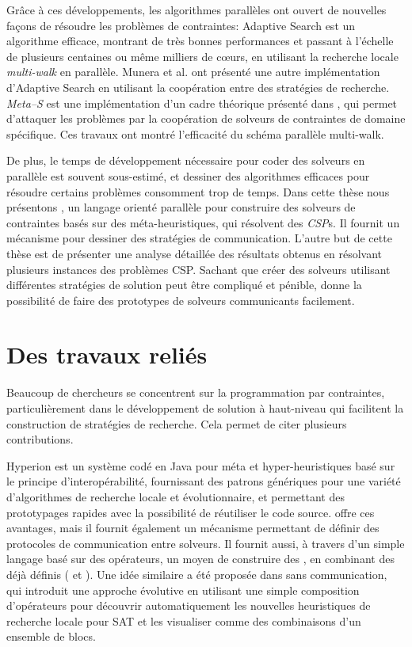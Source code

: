 Gr\^ace \`a ces d\'eveloppements, les algorithmes parall\`eles ont ouvert de nouvelles fa\c{c}ons de r\'esoudre les probl\`emes de contraintes: Adaptive Search \cite{Diaz} est un algorithme efficace, montrant de tr\`es bonnes performances et passant \`a l'\'echelle de plusieurs centaines ou m\^eme milliers de c\oe urs, en utilisant la recherche locale {\it multi-walk} en parall\`ele. Munera et al. \cite{Munera} ont pr\'esent\'e une autre impl\'ementation d'Adaptive Search en utilisant la coop\'eration entre des strat\'egies de recherche. {\it Meta--S} est une impl\'ementation d'un cadre th\'eorique pr\'esent\'e dans \cite{Frank2003}, qui permet d'attaquer les probl\`emes par la coop\'eration de solveurs de contraintes de domaine sp\'ecifique. 
Ces travaux ont montr\'e l'efficacit\'e du sch\'ema parall\`ele multi-walk.  

De plus, le temps de d\'eveloppement n\'ecessaire pour coder des solveurs en parall\`ele est souvent sous-estim\'e, et dessiner des algorithmes efficaces pour r\'esoudre certains probl\`emes consomment trop de temps. Dans cette thèse nous présentons \posl{}, un langage orient\'e parall\`ele pour construire des solveurs de contraintes bas\'es sur des m\'eta-heuristiques, qui r\'esolvent des {\it CSP}s. Il fournit un m\'ecanisme pour dessiner des stratégies de communication. L'autre but de cette thèse est de présenter une analyse d\'etaill\'ee des r\'esultats obtenus en r\'esolvant plusieurs instances des probl\`emes CSP. Sachant que cr\'eer des solveurs utilisant diff\'erentes strat\'egies de solution peut être compliqu\'e et p\'enible, \posl{} donne la possibilit\'e de faire des prototypes de solveurs communicants facilement.  

\section {Des travaux reli\'es}

Beaucoup de chercheurs se concentrent sur la programmation par contraintes, particuli\`erement dans le d\'eveloppement de solution \`a haut-niveau qui facilitent la construction de strat\'egies de recherche. Cela permet de citer plusieurs contributions. 

{\sc Hyperion} \cite{Brownlee2014} est un syst\`eme cod\'e en Java pour m\'eta et hyper-heuristiques bas\'e sur le principe d'interop\'erabilit\'e, fournissant des patrons g\'en\'eriques pour une vari\'et\'e d'algorithmes de recherche locale et \'evolutionnaire, et permettant des prototypages rapides avec la possibilit\'e de r\'eutiliser le code source. \posl{} offre ces avantages, mais il fournit \'egalement un m\'ecanisme permettant de d\'efinir des protocoles de communication entre solveurs. Il fournit aussi, \`a travers d'un simple langage bas\'e sur des op\'erateurs, un moyen de construire des \ass, en combinant des \ms{} d\'ej\`a d\'efinis (\oms{} et \opchs). Une id\'ee similaire a \'et\'e propos\'ee dans \cite{Fukunaga2008} sans communication, qui introduit une approche \'evolutive en utilisant une simple composition d'op\'erateurs pour d\'ecouvrir automatiquement les nouvelles heuristiques de recherche locale pour SAT et les visualiser comme des combinaisons d'un ensemble de blocs.

